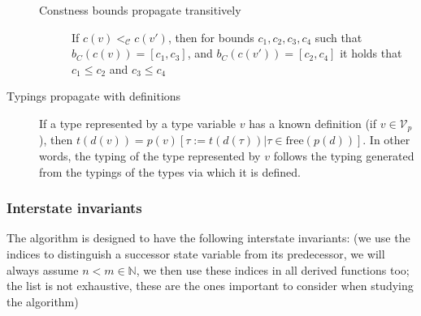 \begin{description}
\begin{description}
            \item[Constness bounds propagate transitively] If $c (v) <_{\mathcal{C}} c (v')$, then for bounds $c_1, c_2, c_3, c_4$ such that $b_C (c (v)) = [c_1, c_3]$, and $b_C (c (v')) = [c_2, c_4]$ it holds that $c_1 \leq c_2$ and $c_3 \leq c_4$
        \end{description}

    \item[Typings propagate with definitions] If a type represented by a type variable $v$ has a known definition (if $v \in \mathcal{V}_p$), then $t (d (v)) = p(v) \left[ \tau := t (d (\tau)) | \tau \in \mathrm{free} (p (d))\right]$. In other words, the typing of the type represented by $v$ follows the typing generated from the typings of the types via which it is defined.
\end{description}

\subsubsection{Interstate invariants}

The algorithm is designed to have the following interstate invariants: (we use the indices to distinguish a successor state variable from its predecessor, we will always assume $n < m \in \mathbb{N}$, we then use these indices in all derived functions too; the list is not exhaustive, these are the ones important to consider when studying the algorithm)

